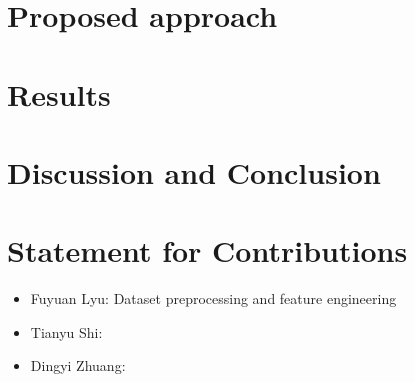 \documentclass[11pt]{scrartcl}
\begin{document}
\section{Proposed approach}

\section{Results}

\section{Discussion and Conclusion}

\section{Statement for Contributions}
\begin{itemize}
	\item Fuyuan Lyu: Dataset preprocessing and feature engineering
	\item Tianyu Shi:
	\item Dingyi Zhuang:
\end{itemize}



\end{document}
